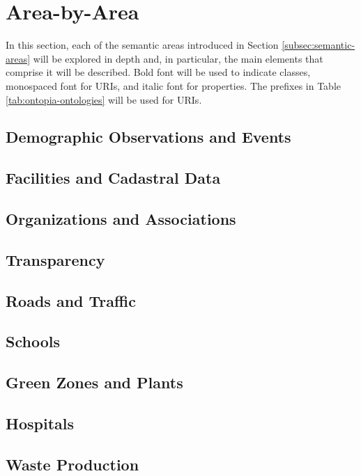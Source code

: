 \section{Area-by-Area}
\label{sec:area-by-area}

In this section, each of the semantic areas introduced in Section \ref{subsec:semantic-areas} will be explored in depth and, in particular, the main elements that comprise it will be described. Bold font will be used to indicate classes, monospaced font for \acp{URI}, and italic font for properties. The prefixes in Table \ref{tab:ontopia-ontologies} will be used for \acp{URI}.

\subsection{Demographic Observations and Events}
\label{subsec:demographic-observations}

\subsection{Facilities and Cadastral Data}
\label{subsec:facilities}

\subsection{Organizations and Associations}
\label{subsec:organizations-associations}

\subsection{Transparency}
\label{subsec:transparency}

\subsection{Roads and Traffic}
\label{subsec:roads-traffic}

\subsection{Schools}
\label{subsec:schools}

\subsection{Green Zones and Plants}
\label{subsec:green-zones}

\subsection{Hospitals}
\label{subsec:hospitals}

\subsection{Waste Production}
\label{subsec:waste-production}